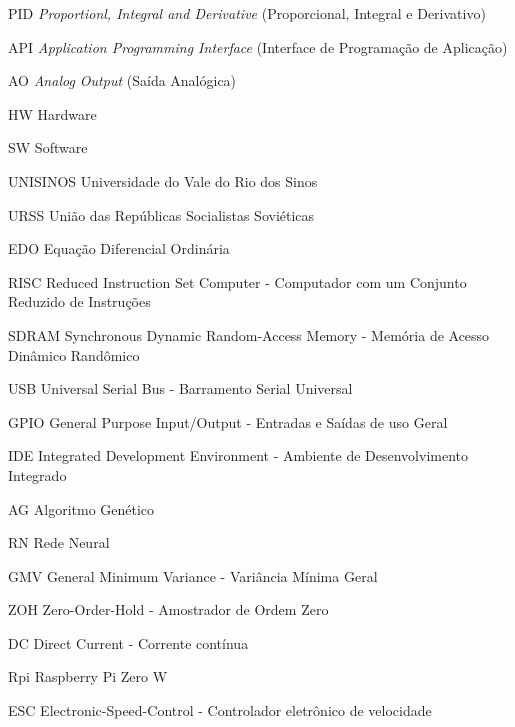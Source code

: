 \listoffigures*
\cleardoublepage
\listoftables*
\cleardoublepage
\begin{siglas}
\item[PID] \textit{Proportionl, Integral and Derivative} (Proporcional, Integral e Derivativo)
\item[API] \textit{Application Programming Interface} (Interface de Programação de Aplicação)
\item[AO] \textit{Analog Output} (Saída Analógica)
\item[HW] Hardware
\item[SW] Software
\item[UNISINOS] Universidade do Vale do Rio dos Sinos
\item[URSS] União das Repúblicas Socialistas Soviéticas
\item[EDO] Equação Diferencial Ordinária
\item[RISC] Reduced Instruction Set Computer - Computador com um Conjunto Reduzido de Instruções
\item[SDRAM] Synchronous Dynamic Random-Access Memory - Memória de Acesso Dinâmico Randômico
\item[USB]  Universal Serial Bus - Barramento Serial Universal
\item[GPIO] General Purpose Input/Output - Entradas e Saídas de uso Geral
\item[IDE] Integrated Development Environment - Ambiente de Desenvolvimento Integrado
\item[AG] Algoritmo Genético
\item[RN] Rede Neural
\item[GMV] General Minimum Variance - Variância Mínima Geral
\item[ZOH] Zero-Order-Hold - Amostrador de Ordem Zero
\item[DC] Direct Current - Corrente contínua
\item[Rpi] Raspberry Pi Zero W
\item[ESC] Electronic-Speed-Control - Controlador eletrônico de velocidade
\end{siglas}
